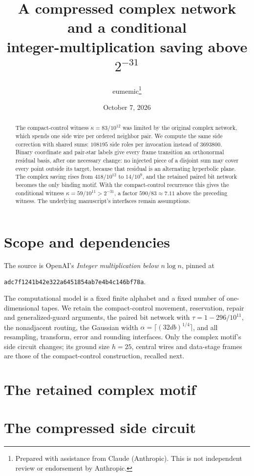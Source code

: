 \documentclass[11pt]{article}
\title{A compressed complex network and a conditional\\
integer-multiplication saving above $2^{-31}$}
\author{eumemic\thanks{Prepared with assistance from Claude (Anthropic).
This is not independent review or endorsement by Anthropic.}}
\date{October 7, 2026}
\begin{document}
\maketitle
\begin{abstract}
The compact-control witness $\kappa=83/10^{12}$ was limited by the original
complex network, which spends one side wire per ordered neighbor pair. We
compute the same side correction with shared sums: $108195$ side roles per
invocation instead of $3693800$. Binary coordinate and pair-star labels give
every frame transition an orthonormal residual basis, after one necessary
change: no injected piece of a disjoint sum may cover every point outside its
target, because that residual is an alternating hyperbolic plane. The
complex saving rises from $418/10^{12}$ to $14/10^9$, and the retained paired
bit network becomes the only binding motif. With the compact-control
recurrence this gives the conditional witness
$\kappa=59/10^{11}>2^{-31}$, a factor $590/83\approx7.11$ above the
preceding witness. The underlying manuscript's interfaces remain assumptions.
\end{abstract}

\section{Scope and dependencies}
The source is OpenAI's \emph{Integer multiplication below $n\log n$}, pinned
at
\begin{center}\texttt{adc7f1241b42e322a6451854ab7e4b4c146bf78a}.\end{center}
The computational model is a fixed finite alphabet and a fixed number of
one-dimensional tapes. We retain the compact-control movement, reservation,
repair and generalized-guard arguments, the paired bit network with
$\tau=1-296/10^{11}$, the nonadjacent routing, the Gaussian width
$\alpha=\lceil(32db)^{1/4}\rceil$, and all resampling, transform, error and
rounding interfaces. Only the complex motif's side circuit changes; its
ground size $h=25$, central wires and data-stage frames are those of the
compact-control construction, recalled next.

\section{The retained complex motif}


\section{The compressed side circuit}

\end{document}

